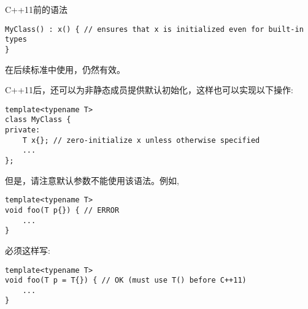 C++11前的语法

\begin{lstlisting}[style=styleCXX]
MyClass() : x() { // ensures that x is initialized even for built-in types
}
\end{lstlisting}

在后续标准中使用，仍然有效。

C++11后，还可以为非静态成员提供默认初始化，这样也可以实现以下操作:

\begin{lstlisting}[style=styleCXX]
template<typename T>
class MyClass {
private:
	T x{}; // zero-initialize x unless otherwise specified
	...
};
\end{lstlisting}

但是，请注意默认参数不能使用该语法。例如,

\begin{lstlisting}[style=styleCXX]
template<typename T>
void foo(T p{}) { // ERROR
	...
}
\end{lstlisting}

必须这样写:

\begin{lstlisting}[style=styleCXX]
template<typename T>
void foo(T p = T{}) { // OK (must use T() before C++11)
	...
}
\end{lstlisting}





















